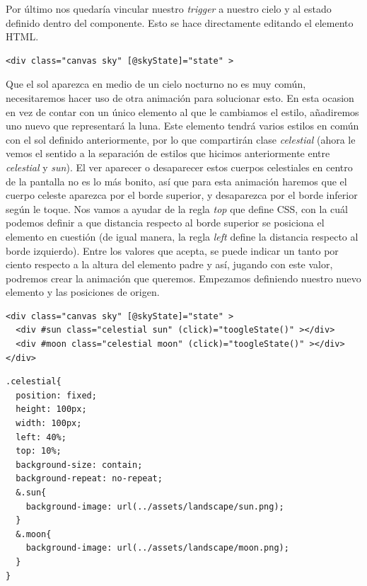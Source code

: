 Por último nos quedaría vincular nuestro \emph{trigger} a nuestro cielo y al estado definido dentro del componente. Esto se hace directamente editando el elemento \gls{HTML}.

{\begin{lstlisting}[style=htmlcssjs,frame=tlrb, xleftmargin={0.2cm}]
<div class="canvas sky" [@skyState]="state" >
\end{lstlisting}}

Que el sol aparezca en medio de un cielo nocturno no es muy común, necesitaremos hacer uso de otra animación para solucionar esto. En esta ocasion en vez de contar con un único elemento al que le cambiamos el estilo, añadiremos uno nuevo que representará la luna. Este elemento tendrá varios estilos en común con el sol definido anteriormente, por lo que compartirán clase \emph{celestial} (ahora le vemos el sentido a la separación de estilos que hicimos anteriormente entre \emph{celestial} y \emph{sun}). El ver aparecer o desaparecer estos cuerpos celestiales en centro de la pantalla no es lo más bonito, así que para esta animación haremos que el cuerpo celeste aparezca por el borde superior, y desaparezca por el borde inferior según le toque. Nos vamos a ayudar de la regla \emph{top} que define \gls{CSS}, con la cuál podemos definir a que distancia respecto al borde superior se posiciona el elemento en cuestión (de igual manera, la regla \emph{left} define la distancia respecto al borde izquierdo). Entre los valores que acepta, se puede indicar un tanto por ciento respecto a la altura del elemento padre y así, jugando con este valor, podremos crear la animación que queremos. Empezamos definiendo nuestro nuevo elemento y las posiciones de origen.

\noindent
\begin{minipage}[t]{.48\textwidth}
{\begin{lstlisting}[style=htmlcssjs,frame=tlrb, xleftmargin={0.2cm}]
<div class="canvas sky" [@skyState]="state" >
  <div #sun class="celestial sun" (click)="toogleState()" ></div>
  <div #moon class="celestial moon" (click)="toogleState()" ></div>
</div>
\end{lstlisting}}
\end{minipage}\hfill
\noindent
\begin{minipage}[t]{.48\textwidth}
{\begin{lstlisting}[style=htmlcssjs,frame=tlrb, xleftmargin={0.2cm}]
.celestial{
  position: fixed;
  height: 100px;
  width: 100px;
  left: 40%;
  top: 10%;
  background-size: contain;
  background-repeat: no-repeat;
  &.sun{
    background-image: url(../assets/landscape/sun.png);
  }
  &.moon{
    background-image: url(../assets/landscape/moon.png);
  }
}
\end{lstlisting}}
\end{minipage}

